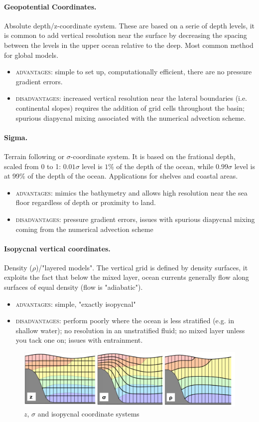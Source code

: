 \paragraph{Geopotential Coordinates.} Absolute depth/z-coordinate system. These are based on a serie of depth levels, it is common to add vertical resolution near the surface by decreasing the spacing between the levels in the upper ocean relative to the deep. Most common method for global models.
\begin{itemize}
	\item \textsc{advantages}: simple to set up, computationally efficient, there are no pressure gradient errors.
	\item \textsc{disadvantages}: increased vertical resolution near the lateral boundaries (i.e. continental slopes) requires the addition of grid cells throughout the basin; spurious diapycnal mixing associated with the numerical advection scheme.
\end{itemize}
\paragraph{Sigma.} Terrain following or $\sigma$-coordinate system. It is based on the frational depth, scaled from 0 to 1: $0.01\sigma$ level is $1\%$ of the depth of the ocean, while $0.99\sigma$ level is at 99\% of the depth of the ocean. Applications for shelves and coastal areas.
\begin{itemize}
	\item \textsc{advantages}: mimics the bathymetry and allows high resolution near the sea floor regardless of depth or proximity to land.
	\item \textsc{disadvantages}: pressure gradient errors, issues with spurious diapycnal mixing coming from the numerical advection scheme
\end{itemize}
\paragraph{Isopycnal vertical coordinates.} Density ($\rho$)/"layered models". The vertical grid is defined by density surfaces, it exploits the fact that below the mixed layer, ocean currents generally flow along surfaces of equal density (flow is "adiabatic").
\begin{itemize}
	\item \textsc{advantages}: simple, "exactly isopycnal"
	\item \textsc{disadvantages}: perform poorly where the ocean is less stratified (e.g. in shallow water); no resolution in an unstratified fluid; no mixed layer unless you tack one on; issues with entrainment.
\end{itemize}
\begin{figure}[htp!]
	\centering
	\includegraphics[width=0.5\linewidth]{uploads/Screenshot 2024-11-22 001323.png}
	\caption{$z$, $\sigma$ and isopycnal coordinate systems}
	\label{fig:enter-label}
\end{figure}
